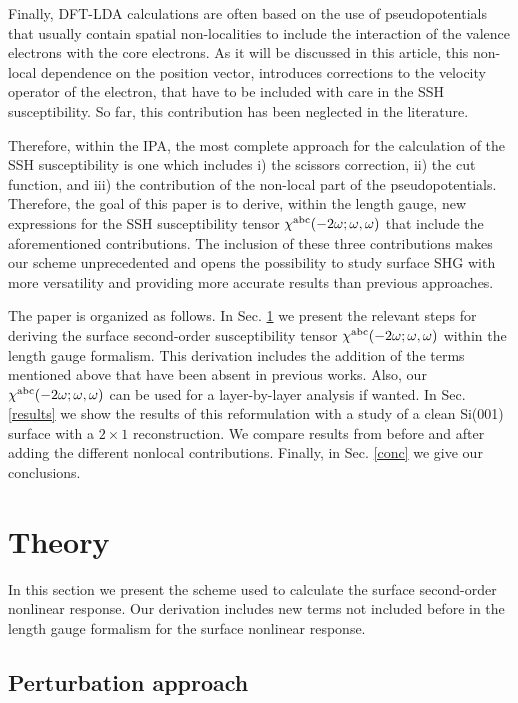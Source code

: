 \documentclass[floatfix,prb,aps,superscriptaddress,11pt,preprint,letterpaper]{revtex4}
\begin{document}
Finally,  DFT-LDA calculations are often based on the use of pseudopotentials
that usually contain spatial non-localities to include the interaction
of the valence electrons with the core electrons.
As it will be discussed in this article, 
 this non-local
dependence on the position vector, introduces corrections to
the velocity operator of the electron, that have to be included with
care in the SSH susceptibility. So far, this contribution has been
neglected in the literature.

Therefore, within the IPA, 
the most complete approach 
for the calculation of the SSH susceptibility is one which includes
i) the scissors correction, ii) the cut function, and iii) the  
contribution of the non-local part of the pseudopotentials.  
Therefore,
the goal of this paper is to derive, within the length gauge, 
new expressions for the 
SSH susceptibility tensor 
$\chi^{\mathrm{a}\mathrm{b}\mathrm{c}}(-2\omega;\omega,\omega)$ 
that include the aforementioned contributions.
The inclusion of these three contributions 
makes 
our scheme unprecedented and opens the possibility to study 
surface SHG with more versatility and providing 
more accurate results than previous approaches. 

The paper is organized as follows. 
In Sec. \ref{theory} we present the 
relevant steps for deriving the surface second-order susceptibility
tensor
$\chi^{\mathrm{a}\mathrm{b}\mathrm{c}}(-2\omega;\omega,\omega)$  
within the length gauge formalism. This derivation includes the addition of 
the terms mentioned above
that have 
been absent in previous works. Also,
our $\chi^{\mathrm{a}\mathrm{b}\mathrm{c}}(-2\omega;\omega,\omega)$  
can be used for a layer-by-layer
analysis if wanted.
In Sec. \ref{results} we show the results of this 
reformulation with a study of a clean Si(001) surface with a 
$2 \times 1$ reconstruction. 
We compare 
results from before and after adding the different nonlocal contributions.
Finally, in Sec. \ref{conc} we give our conclusions.

\section{Theory}

\label{theory}

In this section we present the scheme used to calculate the surface second-order
nonlinear response.
Our derivation includes new terms not included
before in the length gauge formalism for the surface nonlinear
response. 

\subsection{Perturbation approach}
\end{document}
